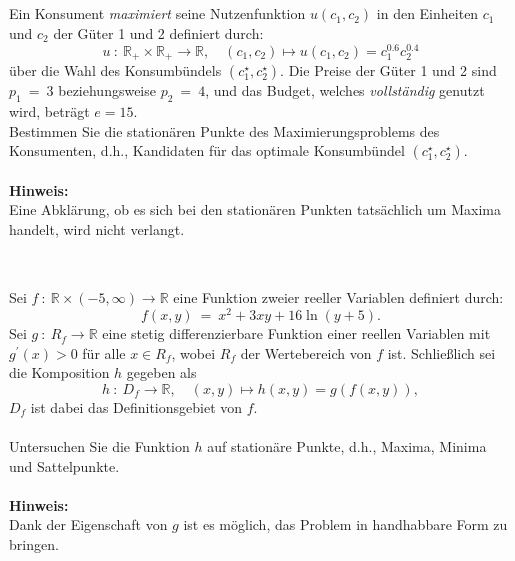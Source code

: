\subsection*{}
Ein Konsument \textit{maximiert} seine Nutzenfunktion $u(c_1,c_2)$ in den Einheiten $c_1$ und $c_2$
der Güter 1 und 2 definiert durch:
\begin{equation*}
u \ : \ \mathbb{R}_+ \times \mathbb{R}_+ \to \mathbb{R},
\quad (c_1,c_2) \mapsto u(c_1,c_2) = c_1^{0.6} c_2^{0.4}
\end{equation*}
über die Wahl des Konsumbündels $(c_1^\star,c_2^\star)$.
Die Preise der Güter 1 und 2 sind $p_1 \ = \ 3$ beziehungsweise $p_2 \ = \ 4$,
und das Budget, welches \textit{vollständig} genutzt wird, beträgt $e = 15$.
\\
Bestimmen Sie die stationären Punkte des Maximierungsproblems des Konsumenten, 
d.h., Kandidaten für das optimale Konsumbündel $(c_1^\star,c_2^\star)$.
\\
\\
\textbf{Hinweis:}\\ 
Eine Abklärung, ob es sich bei den stationären Punkten tatsächlich um Maxima handelt, wird nicht verlangt.
\\
\\
\subsection*{}
Sei $f \ : \ \mathbb{R} \times (-5, \infty) \to \mathbb{R}$ eine Funktion zweier reeller Variablen definiert durch:
\begin{equation*}
f(x,y)\ = \ x^2 + 3 x y + 16 \ln(y+5).
\end{equation*}
Sei $g \ : \ R_f \to \mathbb{R}$ eine stetig differenzierbare Funktion einer reellen Variablen mit $g^\prime(x) > 0$
für alle $x \in R_f$, wobei $R_f$ der Wertebereich von $f$ ist.
Schließlich sei die Komposition $h$ gegeben als
\begin{equation*}
h \ : \ D_f \to \mathbb{R}, \quad (x,y) \mapsto h(x,y) = g(f(x,y)),
\end{equation*}
$D_f$ ist dabei das Definitionsgebiet von $f$.
\\
\\
Untersuchen Sie die Funktion $h$ auf stationäre Punkte, d.h., Maxima, Minima und Sattelpunkte.
\\
\\
\textbf{Hinweis:} \\
Dank der Eigenschaft von $g$ ist es möglich, das Problem in handhabbare Form zu bringen.
\\
\\
